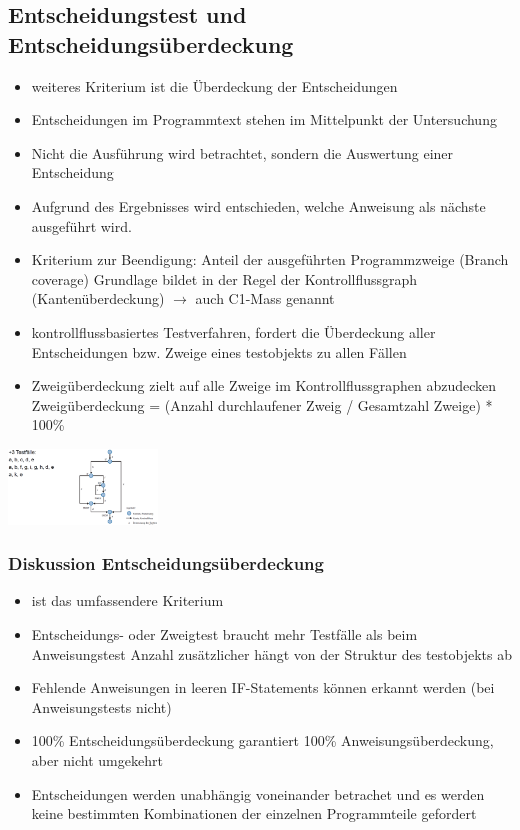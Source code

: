 \documentclass{report}
\newenvironment{Figure}
	{\par\medskip\noindent\minipage{\linewidth}}
	{\endminipage\par\medskip}
\theoremstyle{definition}
\theoremstyle{example}
\begin{document}
\subsection{Entscheidungstest und Entscheidungsüberdeckung}
\begin{itemize}
   \item weiteres Kriterium ist die Überdeckung der Entscheidungen
   \item Entscheidungen im Programmtext stehen im Mittelpunkt der Untersuchung
   \item Nicht die Ausführung wird betrachtet, sondern die Auswertung einer Entscheidung
   \item Aufgrund des Ergebnisses wird entschieden, welche Anweisung als nächste ausgeführt wird.
   \item Kriterium zur Beendigung:
   \subitem Anteil der ausgeführten Programmzweige (Branch coverage)
   \subitem Grundlage bildet in der Regel der Kontrollflussgraph (Kantenüberdeckung) $\rightarrow$ auch C1-Mass genannt
   \item kontrollflussbasiertes Testverfahren, fordert die Überdeckung aller Entscheidungen bzw. Zweige eines testobjekts zu allen Fällen
   \item Zweigüberdeckung zielt auf alle Zweige im Kontrollflussgraphen abzudecken
   \subitem Zweigüberdeckung = (Anzahl durchlaufener Zweig / Gesamtzahl Zweige) * 100\% 
\end{itemize}

\begin{Figure}
   \centering
    \includegraphics[width=150px]{img/Entscheidungsueberdeckung.png}
        \label{fig:Beispiel Entscheidungsueberdeckung}
    \end{Figure}

    \subsubsection{Diskussion Entscheidungsüberdeckung}
\begin{itemize}
   \item ist das umfassendere Kriterium
   \item Entscheidungs- oder Zweigtest braucht mehr Testfälle als beim Anweisungstest
   \subitem Anzahl zusätzlicher hängt von der Struktur des testobjekts ab
   \item Fehlende Anweisungen in leeren IF-Statements können erkannt werden (bei Anweisungstests nicht)
   \item 100\% Entscheidungsüberdeckung garantiert 100\% Anweisungsüberdeckung, aber nicht umgekehrt
   \item Entscheidungen werden unabhängig voneinander betrachet und es werden keine bestimmten Kombinationen der einzelnen Programmteile gefordert
\end{itemize}
\end{document}
